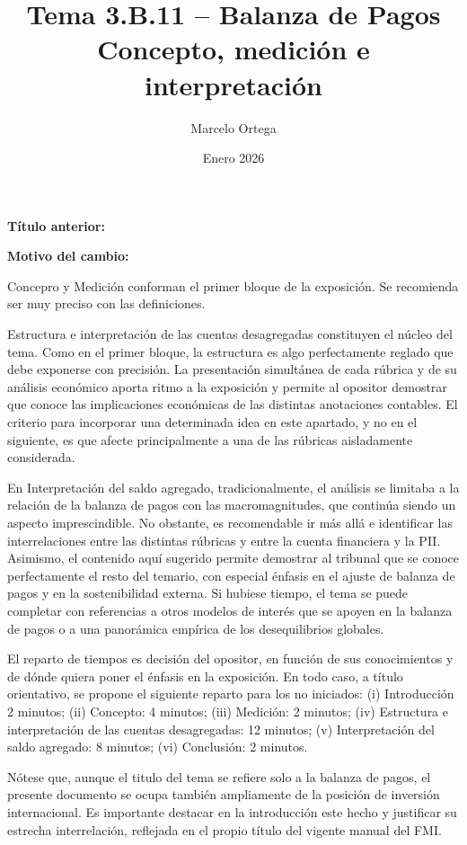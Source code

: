 \documentclass[10pt,a4paper]{article}
\title{Tema 3.B.11 -- Balanza de Pagos\\
\large Concepto, medición e interpretación}
\author{Marcelo Ortega}
\date{Enero 2026}
\newcommand{\puntosclave}[1]{%
  \begin{tcolorbox}[
    colframe=black,
    title={Puntos clave},
    before upper={\setlength{\parindent}{0.5cm}\setlength{\parskip}{0.5\baselineskip}}
  ]
  #1
  \end{tcolorbox}
}
\newcommand{\changebox}{%
\begin{tcolorbox}[title={Historial de cambios del tema}]
\textbf{Título anterior:} \OldTitle\par
\textbf{Motivo del cambio:} \ChangeWhy
\end{tcolorbox}
}
\begin{document}
\maketitle
\changebox

\newpage

\puntosclave{ %
     Concepro y Medición conforman el primer bloque de la exposición. Se recomienda ser muy preciso con las definiciones.

     Estructura e interpretación de las cuentas desagregadas constituyen el núcleo del tema. Como en el primer bloque, la estructura es algo perfectamente reglado que debe exponerse con precisión. La presentación simultánea de cada rúbrica y de su análisis económico aporta ritmo a la exposición y permite al opositor demostrar que conoce las implicaciones económicas de las distintas anotaciones contables. El criterio para incorporar una determinada idea en este apartado, y no en el siguiente, es que afecte principalmente a una de las rúbricas aisladamente considerada.

     En Interpretación del saldo agregado, tradicionalmente, el análisis se limitaba a la relación de la balanza de pagos con las macromagnitudes, que continúa siendo un aspecto imprescindible. No obstante, es recomendable ir más allá e identificar las interrelaciones entre las distintas rúbricas y entre la cuenta financiera y la PII. Asimismo, el contenido aquí sugerido permite demostrar al tribunal que se conoce perfectamente el resto del temario, con especial énfasis en el ajuste de balanza de pagos y en la sostenibilidad externa. Si hubiese tiempo, el tema se puede completar con referencias a otros modelos de interés que se apoyen en la balanza de pagos o a una panorámica empírica de los desequilibrios globales.

     El reparto de tiempos es decisión del opositor, en función de sus conocimientos y de dónde quiera poner el énfasis en la exposición. En todo caso, a título orientativo, se propone el siguiente reparto para los no iniciados: (i) Introducción 2 minutos; (ii) Concepto: 4 minutos; (iii) Medición: 2 minutos; (iv) Estructura e interpretación de las cuentas desagregadas: 12 minutos; (v) Interpretación del saldo agregado: 8 minutos; (vi) Conclusión: 2 minutos. 
     
     Nótese que, aunque el titulo del tema se refiere solo a la balanza de pagos, el presente documento se ocupa también ampliamente de la posición de inversión internacional. Es importante destacar en la introducción este hecho y justificar su estrecha interrelación, reflejada en el propio título del vigente manual del FMI.
    }
\vspace{1cm}
\end{document}
